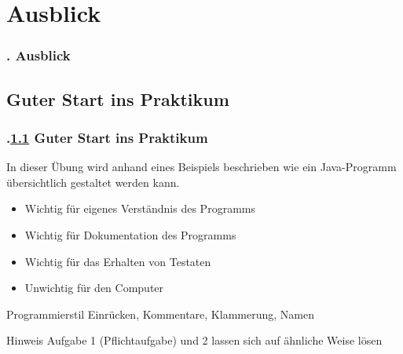 \AtBeginSection{
}
\section{Ausblick}
\begin{frame}
\frametitle{\kap. Ausblick}%
\tableofcontents
\end{frame}
\def\stitle{Guter Start ins Praktikum}%
\subsection{\stitle}\label{S:Guter Start}
\begin{frame}[t]%
  \frametitle{\kap.\ref{S:Guter Start} \stitle}%
\medskip

In dieser \"Ubung wird anhand eines Beispiels beschrieben wie ein Java-Programm \"ubersichtlich gestaltet werden kann.

\pause
\begin{itemize}
    \item Wichtig f\"ur eigenes Verst\"andnis des Programms
    \item Wichtig f\"ur Dokumentation des Programms
    \item Wichtig f\"ur das Erhalten von Testaten
    \item Unwichtig f\"ur den Computer
\end{itemize}

\pause \bigskip
\begin{block}{Programmierstil}
Einr\"ucken, Kommentare, Klammerung, Namen
\end{block}

\pause \bigskip
\begin{block}{Hinweis}
Aufgabe 1 (Pflichtaufgabe) und 2 lassen sich auf \"ahnliche Weise l\"osen
\end{block}

\end{frame}

\def\stitle{Beispiel Obelisk}%
